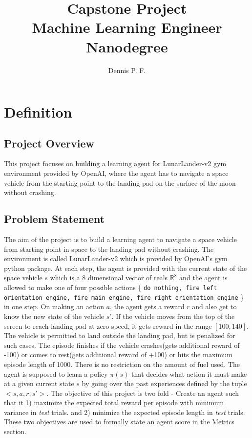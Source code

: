 \documentclass{article}
\begin{document}
\title{Capstone Project \\ {\large Machine Learning Engineer Nanodegree}}
\author{Dennis P. F.}
\maketitle
\pagestyle{empty}
\section{Definition}
\subsection*{Project Overview}
This project focuses on building a learning agent for LunarLander-v2 gym environment provided by OpenAI\cite{challenge}, where the agent has to navigate a space vehicle from the starting point to the landing pad on the surface of the moon without crashing.
\subsection*{Problem Statement}
The aim of the project is to build a learning agent to navigate a space vehicle from starting point in space to the landing pad without crashing. The environment is called LunarLander-v2 which is provided by OpenAI's gym python package. At each step, the agent is provided with the current state of the space vehicle $s$ which is a 8 dimensional vector of reals $\mathbb{R}^8$ and the agent is allowed to make one of four possible actions \{ \texttt{do nothing, fire left orientation engine, fire main engine, fire right orientation engine} \} in one step. On making an action $a$, the agent gets a reward $r$ and also get to know the new state of the vehicle $s'$. If the vehicle moves from the top of the screen to reach landing pad at zero speed, it gets reward in the range $[100, 140]$. The vehicle is permitted to land outside the landing pad, but is penalized for such cases. The episode finishes if the vehicle crashes(gets additional reward of -100) or comes to rest(gets additional reward of +100) or hits the maximum episode length of 1000. There is no restriction on the amount of fuel used. The agent is supposed to learn a policy $\pi(s)$ that decides what action it must make at a given current state $s$ by going over the past experiences defined by the tuple $<s, a, r, s'>$.  The objective of this project is two fold - Create an agent such that it 1) maximize the expected total reward per episode with minimum variance in \textit{test} trials. and 2) minimize the expected episode length in \textit{test} trials. These two objectives are used to formally state an agent score in the Metrics section.
\end{document}

